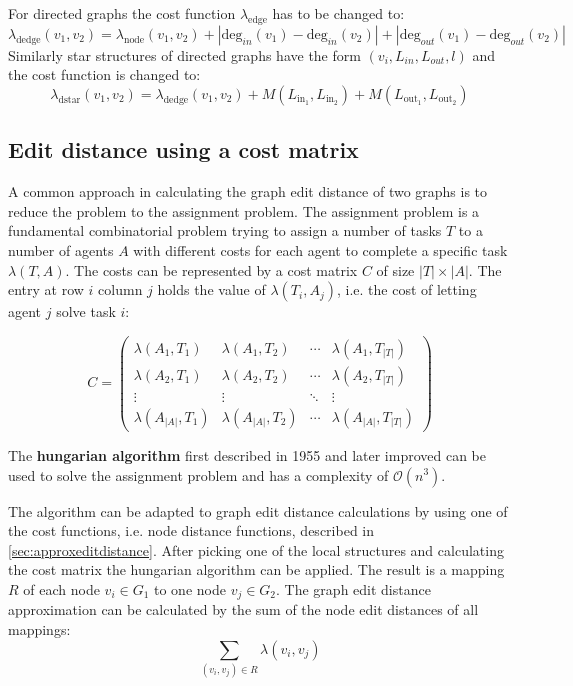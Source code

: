 \documentclass[
    12pt,                               %
    DIV=14,                     %
    parskip=half+,              %
    bigheadings,                %
    cleardoubleempty,   %
    halfparskip,                %
    ]{scrreprt} %
\begin{document}
For directed graphs the cost function $\lambda_{\text{edge}}$ has to be changed to:
\begin{equation}
	\lambda_{\text{dedge}}(v_1, v_2) = \lambda_{\text{node}}(v_1, v_2) + |\text{deg}_{in}(v_1) - \text{deg}_{in}(v_2)| + |\text{deg}_{out}(v_1) - \text{deg}_{out}(v_2)|
\end{equation}
Similarly star structures of directed graphs have the form $(v_i, L_{in}, L_{out}, l)$ and the cost function is changed to:
\begin{equation}
	\lambda_{\text{dstar}}(v_1, v_2) = \lambda_{\text{dedge}}(v_1, v_2) + M(L_{\text{in}_1}, L_{\text{in}_2}) + M(L_{\text{out}_1}, L_{\text{out}_2})
\end{equation}

\subsection{Edit distance using a cost matrix} \label{sec:assign}
A common approach in calculating the graph edit distance of two graphs is to reduce the problem to the assignment problem. The assignment problem is a fundamental combinatorial problem trying to assign a number of tasks $T$ to a number of agents $A$ with different costs for each agent to complete a specific task $\lambda(T, A)$. The costs can be represented by a cost matrix $C$ of size $|T| \times |A|$. The entry at row $i$ column $j$ holds the value of $\lambda(T_i, A_j)$, i.e. the cost of letting agent $j$ solve task $i$:

\begin{equation}
	C =
	\begin{pmatrix}
		\lambda(A_1, T_1) & \lambda(A_1, T_2) & \cdots & \lambda(A_1, T_{|T|}) \\
		\lambda(A_2, T_1) & \lambda(A_2, T_2) & \cdots & \lambda(A_2, T_{|T|}) \\
		\vdots  & \vdots  & \ddots & \vdots  \\
		\lambda(A_{|A|}, T_1) & \lambda(A_{|A|}, T_2) & \cdots & \lambda(A_{|A|}, T_{|T|})
	\end{pmatrix}
\end{equation}

The \textbf{hungarian algorithm}\cite{hungarian1} first described in 1955 and later improved\cite{hungarian2,hungarian3,hungarian4} can be used to solve the assignment problem and has a complexity of $\mathcal{O}(n^3)$.

The algorithm can be adapted to graph edit distance calculations by using one of the cost functions, i.e. node distance functions, described in \ref{sec:approxeditdistance}.
After picking one of the local structures and calculating the cost matrix the hungarian algorithm can be applied. The result is a mapping $R$ of each node $v_i \in G_1$ to one node $v_j \in G_2$. The graph edit distance approximation can be calculated by the sum of the node edit distances of all mappings:
\begin{equation}
\sum_{(v_i, v_j) \in R} \lambda(v_i, v_j)
\end{equation}
\end{document}

